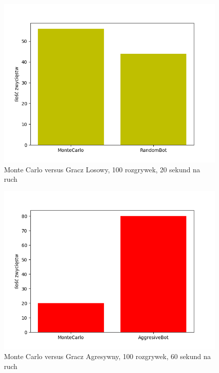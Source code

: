 \documentclass[a4paper, 12pt]{article}
\begin{document}
\begin{figure}[H]
	\centering
	\includegraphics[scale=0.75]{20-100_r_vs_m.png}
	\caption{Monte Carlo versus Gracz Losowy, 100 rozgrywek, 20 sekund na ruch}
\end{figure}

\begin{figure}[H]
	\centering
	\includegraphics[scale=0.75]{60-100_a_vs_m.png}
	\caption{Monte Carlo versus Gracz Agresywny, 100 rozgrywek, 60 sekund na ruch}
\end{figure}
\end{document}
